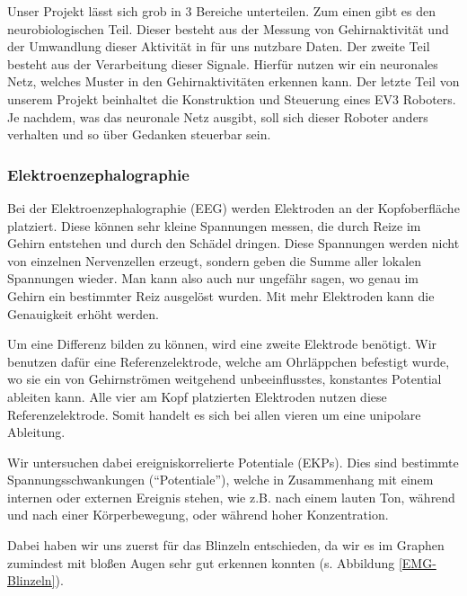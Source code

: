 \documentclass[11pt]{scrartcl}
\begin{document}
	Unser Projekt lässt sich grob in 3 Bereiche unterteilen. Zum einen gibt es den neurobiologischen Teil. Dieser besteht aus der Messung von Gehirnaktivität und der Umwandlung dieser Aktivität in für uns nutzbare Daten. Der zweite Teil besteht aus der Verarbeitung dieser Signale. Hierfür nutzen wir ein neuronales Netz, welches Muster in den Gehirnaktivitäten erkennen kann. Der letzte Teil von unserem Projekt beinhaltet die Konstruktion und Steuerung eines EV3 Roboters. Je nachdem, was das neuronale Netz ausgibt, soll sich dieser Roboter anders verhalten und so über Gedanken steuerbar sein.	

	\subsubsection{Elektroenzephalographie}

	Bei der Elektroenzephalographie (EEG) werden Elektroden an der Kopfoberfläche platziert. Diese können sehr kleine Spannungen messen, die durch Reize im Gehirn entstehen und durch den Schädel dringen. Diese Spannungen werden nicht von einzelnen Nervenzellen erzeugt, sondern geben die Summe aller lokalen Spannungen wieder. Man kann also auch nur ungefähr sagen, wo genau im Gehirn ein bestimmter Reiz ausgelöst wurden. Mit mehr Elektroden kann die Genauigkeit erhöht werden. \cite{wiki:EEG} \cite{Birbaumer2010}

	Um eine Differenz bilden zu können, wird eine zweite Elektrode benötigt. Wir benutzen dafür eine Referenzelektrode, welche am Ohrläppchen befestigt wurde, wo sie ein von Gehirnströmen weitgehend unbeeinflusstes, konstantes Potential ableiten kann. Alle vier am Kopf platzierten Elektroden nutzen diese Referenzelektrode. Somit handelt es sich bei allen vieren um eine unipolare Ableitung. \cite{Praktikum}

	Wir untersuchen dabei ereigniskorrelierte Potentiale (EKPs). Dies sind bestimmte Spannungsschwankungen (\enquote{Potentiale}), welche in Zusammenhang mit einem internen oder externen Ereignis stehen, wie z.B. nach einem lauten Ton, während und nach einer Körperbewegung, oder während hoher Konzentration. \cite{Birbaumer2010} \cite{Praktikum}

	Dabei haben wir uns zuerst für das Blinzeln entschieden, da wir es im Graphen zumindest mit bloßen Augen sehr gut erkennen konnten (s. Abbildung \ref{EMG-Blinzeln}).
\end{document}
